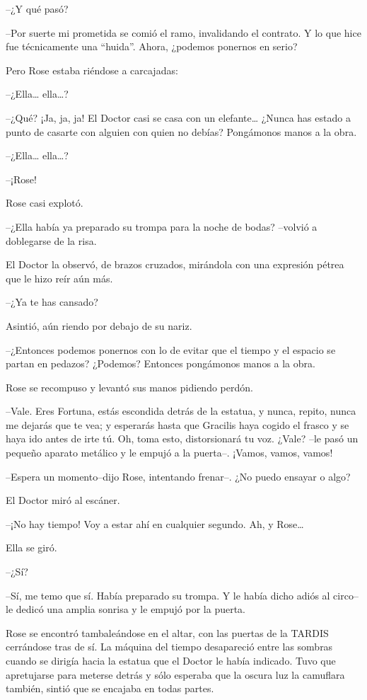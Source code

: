 --¿Y qué pasó?

--Por suerte mi prometida se comió el ramo, invalidando el contrato. Y
lo que hice fue técnicamente una ``huida''. Ahora, ¿podemos ponernos en
serio?

Pero Rose estaba riéndose a carcajadas:

--¿Ella\ldots{} ella\ldots{}?

--¿Qué? ¡Ja, ja, ja! El Doctor casi se casa con un elefante\ldots{}
¿Nunca has estado a punto de casarte con alguien con quien no debías?
Pongámonos manos a la obra.

--¿Ella\ldots{} ella\ldots{}?

--¡Rose!

Rose casi explotó.

--¿Ella había ya preparado su trompa para la noche de bodas? --volvió a
doblegarse de la risa.

El Doctor la observó, de brazos cruzados, mirándola con una expresión
pétrea que le hizo reír aún más.

--¿Ya te has cansado?

Asintió, aún riendo por debajo de su nariz.

--¿Entonces podemos ponernos con lo de evitar que el tiempo y el espacio
se partan en pedazos? ¿Podemos? Entonces pongámonos manos a la obra.

Rose se recompuso y levantó sus manos pidiendo perdón.

--Vale. Eres Fortuna, estás escondida detrás de la estatua, y nunca,
repito, nunca me dejarás que te vea; y esperarás hasta que Gracilis haya
cogido el frasco y se haya ido antes de irte tú. Oh, toma esto,
distorsionará tu voz. ¿Vale? --le pasó un pequeño aparato metálico y le
empujó a la puerta--. ¡Vamos, vamos, vamos!

--Espera un momento--dijo Rose, intentando frenar--. ¿No puedo ensayar o
algo?

El Doctor miró al escáner.

--¡No hay tiempo! Voy a estar ahí en cualquier segundo. Ah, y
Rose\ldots{}

Ella se giró.

--¿Sí?

--Sí, me temo que sí. Había preparado su trompa. Y le había dicho adiós
al circo--le dedicó una amplia sonrisa y le empujó por la puerta.

Rose se encontró tambaleándose en el altar, con las puertas de la TARDIS
cerrándose tras de sí. La máquina del tiempo desapareció entre las
sombras cuando se dirigía hacia la estatua que el Doctor le había
indicado. Tuvo que apretujarse para meterse detrás y sólo esperaba que
la oscura luz la camuflara también, sintió que se encajaba en todas
partes.

